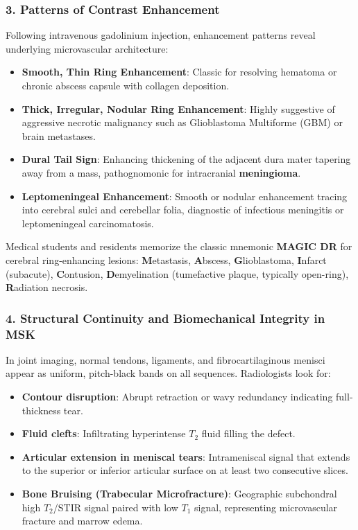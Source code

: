 \documentclass[11pt,a4paper]{article}
\begin{document}
\subsubsection{3. Patterns of Contrast Enhancement}
Following intravenous gadolinium injection, enhancement patterns reveal underlying microvascular architecture:
\begin{itemize}
    \item \textbf{Smooth, Thin Ring Enhancement}: Classic for resolving hematoma or chronic abscess capsule with collagen deposition.
    \item \textbf{Thick, Irregular, Nodular Ring Enhancement}: Highly suggestive of aggressive necrotic malignancy such as Glioblastoma Multiforme (GBM) or brain metastases.
    \item \textbf{Dural Tail Sign}: Enhancing thickening of the adjacent dura mater tapering away from a mass, pathognomonic for intracranial \textbf{meningioma}.
    \item \textbf{Leptomeningeal Enhancement}: Smooth or nodular enhancement tracing into cerebral sulci and cerebellar folia, diagnostic of infectious meningitis or leptomeningeal carcinomatosis.
\end{itemize}

\begin{clinicalpearl}
Medical students and residents memorize the classic mnemonic \textbf{MAGIC DR} for cerebral ring-enhancing lesions:
\textbf{M}etastasis, \textbf{A}bscess, \textbf{G}lioblastoma, \textbf{I}nfarct (subacute), \textbf{C}ontusion, \textbf{D}emyelination (tumefactive plaque, typically open-ring), \textbf{R}adiation necrosis.
\end{clinicalpearl}

\subsubsection{4. Structural Continuity and Biomechanical Integrity in MSK}
In joint imaging, normal tendons, ligaments, and fibrocartilaginous menisci appear as uniform, pitch-black bands on all sequences. Radiologists look for:
\begin{itemize}
    \item \textbf{Contour disruption}: Abrupt retraction or wavy redundancy indicating full-thickness tear.
    \item \textbf{Fluid clefts}: Infiltrating hyperintense $T_2$ fluid filling the defect.
    \item \textbf{Articular extension in meniscal tears}: Intrameniscal signal that extends to the superior or inferior articular surface on at least two consecutive slices.
    \item \textbf{Bone Bruising (Trabecular Microfracture)}: Geographic subchondral high $T_2$/STIR signal paired with low $T_1$ signal, representing microvascular fracture and marrow edema.
\end{itemize}
\end{document}
